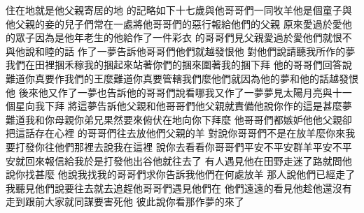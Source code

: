 \bchapter%
住在地\chientien 就是他父親寄居的地\chuan 
{}的記略如下\yuentien{}十七歲與他哥哥們一同牧羊\chientien 他是個童子\chientien 與他父親的妾\chientien{}的兒子們常在一處\yuentien{}將他哥哥們的惡行\chientien 報給他們的父親\chuan 
{}原來愛過於愛他的眾子\chientien 因為是他年老生的\chientien 他給作了一件彩衣\chuan 
{}的哥哥們見父親愛過於愛他們\chientien 就恨\chientien 不與他說和睦的話\chuan\Chuan
{}作了一夢\chientien 告訴他哥哥們\chientien 他們就越發恨他\chuan 
{}對他們說\chientien 請聽我所作的夢\yuentien 
{}我們在田裡捆禾稼\chientien 我的捆起來站著\chientien 你們的捆來圍著我的捆下拜\chuan 
{}他的哥哥們回答說\chientien 難道你真要作我們的王麼\chientien 難道你真要管轄我們麼\yuentien 他們就因為他的夢\chientien 和他的話\chientien 越發恨他\chuan 
{}後來他又作了一夢\chientien 也告訴他的哥哥們說\chientien 看哪\chientien 我又作了一夢\chientien 夢見太陽\chientien 月亮\chientien 與十一個星\chientien 向我下拜\chuan 
{}將這夢告訴他父親\chientien 和他哥哥們\chientien 他父親就責備他說\chientien 你作的這是甚麼夢\chientien 難道我和你母親\chientien 你弟兄\chientien 果然要來俯伏在地\chientien 向你下拜麼\chuan 
{}他哥哥們都嫉妒他\yuentien 他父親卻把這話存在心裡\chuan\Chuan
{}的哥哥們往去\chientien 放他們父親的羊\chuan 
{}對說\chientien 你哥哥們不是在放羊麼\chientien 你來\chientien 我要打發你往他們那裡去\chuan{}說\chientien 我在這裡\chuan 
{}說\chientien 你去看看你哥哥們平安不平安\chientien 群羊平安不平安\chientien 就回來報信給我\yuentien 於是打發他出谷\chientien 他就往去了\chuan 
{}有人遇見他在田野走迷了路\chientien 就問他說\chientien 你找甚麼\chuan 
{}他說\chientien 我找我的哥哥們\chientien 求你告訴我\chientien 他們在何處放羊\chuan 
{}那人說\chientien 他們已經走了\chientien 我聽見他們說\chientien 要往去\yuentien{}就去追趕他哥哥們\chientien 遇見他們在\chuan\Chuan
{}他們遠遠的看見他\chientien 趁他還沒有走到跟前\chientien 大家就同謀要害死他\chuan 
{}彼此說\chientien 你看\chientien 那作夢的來了\chuan 
